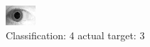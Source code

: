 \begin{figure}[h!]
\begin{center}
\includegraphics[width=0.60\columnwidth]{figures/ID1928_class_4_target_3.png}
\end{center}
\caption{ Classification: 4 actual target: 3}
\label{fig:ID1928_class_4_target_3}
\end{figure}
